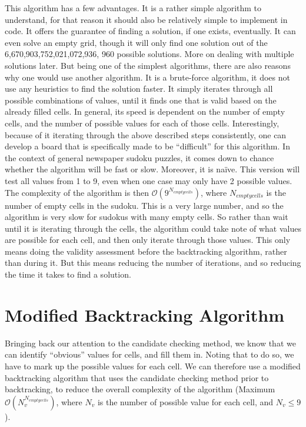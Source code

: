 \documentclass[12pt]{report} %
\begin{document}
\vspace*{1\baselineskip}
This algorithm has a few advantages. It is a rather simple algorithm to understand, for that reason it should also be relatively simple to implement in code. It offers the guarantee of finding a solution, if one exists, eventually. It can even solve an empty grid, though it will only find one solution out of the 6,670,903,752,021,072,936, 960 possible solutions\cite{cornell_sudoku3}. More on dealing with multiple solutions later.
But being one of the simplest algorithms, there are also reasons why one would use another algorithm. It is a brute-force algorithm, it does not use any heuristics to find the solution faster. It simply iterates through all possible combinations of values, until it finds one that is valid based on the already filled cells. In general, its speed is dependent on the number of empty cells, and the number of possible values for each of those cells. Interestingly, because of it iterating through the above described steps consistently, one can develop a board that is specifically made to be ``difficult'' for this algorithm. In the context of general newspaper sudoku puzzles, it comes down to chance whether the algorithm will be fast or slow. Moreover, it is naïve. This version will test all values from 1 to 9, even when one case may only have 2 possible values. The complexity of the algorithm is then $\mathcal{O}(9^{N_{empty cells}})$, where $N_{empty cells}$ is the number of empty cells in the sudoku. This is a very large number, and so the algorithm is very slow for sudokus with many empty cells.
So rather than wait until it is iterating through the cells, the algorithm could take note of what values are possible for each cell, and then only iterate through those values. This only means doing the validity assessment before the backtracking algorithm, rather than during it. But this means reducing the number of iterations, and so reducing the time it takes to find a solution.

\section{Modified Backtracking Algorithm}


Bringing back our attention to the candidate checking method, we know that we can identify ``obvious'' values for cells, and fill them in. Noting that to do so, we have to mark up the possible values for each cell. We can therefore use a modified backtracking algorithm that uses the candidate checking method prior to backtracking, to reduce the overall complexity of the algorithm (Maximum $\mathcal{O}(N_{v}^{N_{empty cells}})$, where $N_{v}$ is the number of possible value for each cell, and $N_{v}\leq 9$).
\end{document}
